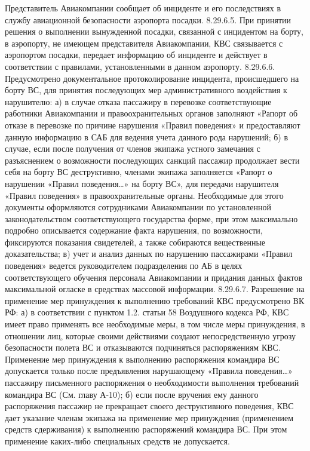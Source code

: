 Представитель Авиакомпании сообщает об инциденте и его последствиях в службу авиационной безопасности аэропорта посадки.
8.29.6.5. При принятии решения о выполнении вынужденной посадки, связанной с инцидентом на борту, в аэропорту, не имеющем представителя Авиакомпании, КВС связывается с аэропортом посадки, передает информацию об инциденте и действует в соответствии с правилами, установленными в данном аэропорту.
8.29.6.6. Предусмотрено документальное протоколирование инцидента, происшедшего на борту ВС, для принятия последующих мер административного воздействия к нарушителю:
а)	в случае отказа пассажиру в перевозке соответствующие работники Авиакомпании и правоохранительных органов заполняют «Рапорт об отказе в перевозке по причине нарушения «Правил поведения» и предоставляют данную информацию в САБ для ведения учета данного рода нарушений;
б)	в случае, если после получения от членов экипажа устного замечания с разъяснением о возможности последующих санкций пассажир продолжает вести себя на борту ВС деструктивно, членами экипажа заполняется «Рапорт о нарушении «Правил поведения…» на борту ВС», для передачи нарушителя «Правил поведения» в правоохранительные органы. Необходимые для этого документы оформляются сотрудниками Авиакомпании по установленной законодательством соответствующего государства форме, при этом максимально подробно описывается содержание факта нарушения, по возможности, фиксируются показания свидетелей, а также собираются вещественные доказательства;
в)	учет и анализ данных по нарушению пассажирами «Правил поведения» ведется руководителем подразделения по АБ в целях соответствующего обучения персонала Авиакомпании и придания данных фактов максимальной огласке в средствах массовой информации.
8.29.6.7. Разрешение на применение мер принуждения к выполнению требований КВС предусмотрено ВК РФ:
а)	в соответствии с пунктом 1.2. статьи 58 Воздушного кодекса РФ, КВС имеет право применять все необходимые меры, в том числе меры принуждения, в отношении лиц, которые своими действиями создают непосредственную угрозу безопасности полета ВС и отказываются подчиняться распоряжениям КВС. Применение мер принуждения к выполнению распоряжения командира ВС допускается только после предъявления нарушающему «Правила поведения…» пассажиру письменного распоряжения о необходимости выполнения требований командира ВС (См. главу А-10);
б)	если после вручения ему данного распоряжения пассажир не прекращает своего деструктивного поведения, КВС дает указание членам экипажа на применение мер принуждения (применением средств сдерживания) к выполнению распоряжений командира ВС. При этом применение каких-либо специальных средств не допускается.
